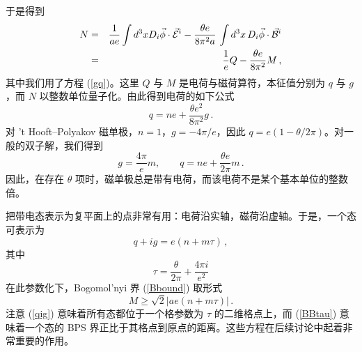 于是得到
\begin{eqnarray}
N &=&\frac{1}{ae} \int d^{3}x D_{i}\vec{\phi} \cdot \vec{\cal E}^i
- \frac{\theta e}{8\pi^{2}a}\,\int d^3x \, D_{i}\vec{\phi}
\cdot \vec{\cal B}^i \nonumber\\
&=& \frac{1}{e} Q - \frac{\theta e}{8 \pi^2} M \,,\nonumber
\end{eqnarray}
其中我们用了方程 (\ref{gq})。这里 $Q$ 与 $M$ 是电荷与磁荷算符，本征值分别为 $q$ 与 $g$，而 $N$ 以整数单位量子化。由此得到电荷的如下公式
$$
q=ne + \frac{\theta e^2}{8\pi^2} g \,.
$$  
对 't Hooft–Polyakov 磁单极，$n=1$，$g=-4\pi/e$，因此 $q=e(1-\theta/2\pi)$。对一般的双子解，我们得到
\begin{equation}
g= \frac{4\pi}{e} m,\qquad q = ne + \frac{\theta e}{2\pi}m\,.
\label{gqtheta}
\end{equation}
因此，在存在 $\theta$ 项时，磁单极总是带有电荷，而该电荷不是某个基本单位的整数倍。

把带电态表示为复平面上的点非常有用：电荷沿实轴，磁荷沿虚轴。于是，一个态可表示为
\begin{equation}
q+ig=e(n+m\tau)\,,
\label{qig}
\end{equation}
其中
\begin{equation}
\tau=\frac{\theta}{2\pi} + \frac{4\pi i}{e^2}
\label{tau}
\end{equation}
在此参数化下，Bogomol'nyi 界 (\ref{Bbound}) 取形式
\begin{equation}
M \geq {\sqrt 2}|ae(n+m\tau)|\,.
\label{BBtau}
\end{equation}
注意 (\ref{qig}) 意味着所有态都位于一个格参数为 $\tau$ 的二维格点上，而 (\ref{BBtau}) 意味着一个态的 BPS 界正比于其格点到原点的距离。这些方程在后续讨论中起着非常重要的作用。
